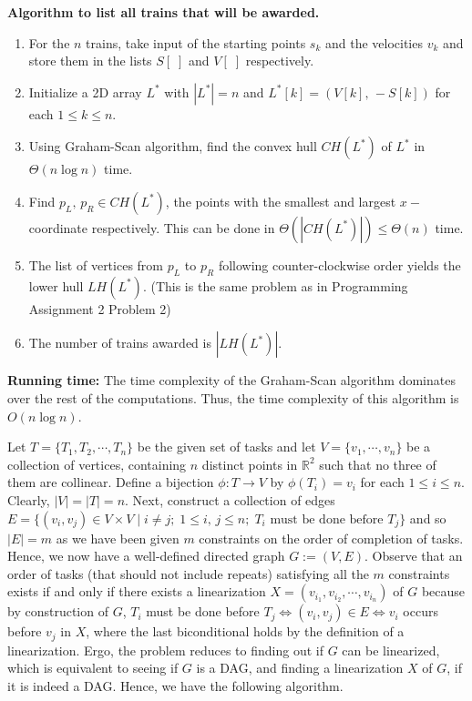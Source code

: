 \documentclass[tikz, letterpaper,12pt]{article}
\newcommand{\RR}{\mathbb{R}}
\newcounter{problemid}\stepcounter{problemid}
\def\newproblem{\vspace*{0.01cm}{\bf Problem~\arabic{problemid}\stepcounter{problemid}}\hfill\fbox{\parbox{0.16\textwidth}{\bf Points:}}\par}
\begin{document}
\textbf{Algorithm to list all trains that will be awarded.}
\begin{enumerate}
  \item For the $n$ trains, take input of the starting points $s_k$ and the velocities $v_k$ and store them in the lists $S[\;]$ and $V[\;]$ respectively.
  \item Initialize a 2D array $L^*$ with $|L^*|=n$ and $L^*[k]=(V[k],\,-S[k])$ for each $1\leq k\leq n$.
  \item Using Graham-Scan algorithm, find the convex hull $CH(L^*)$ of $L^*$ in $\Theta(n\log n)$ time.
  \item Find $p_L,\,p_R\in CH(L^*)$, the points with the smallest and largest $x-$coordinate respectively. This can be done in $\Theta(|CH(L^*)|)\leq\Theta(n)$ time.
  \item The list of vertices from $p_L$ to $p_R$ following counter-clockwise order yields the lower hull $LH(L^*)$. (This is the same problem as in Programming Assignment 2 Problem 2)
  \item The number of trains awarded is $|LH(L^{\ast})|$.
\end{enumerate}

\textbf{Running time:} The time complexity of the Graham-Scan algorithm dominates over the rest of the computations. Thus, the time complexity of this algorithm is $O(n\log n)$.

\newproblem
Let $T=\{T_1,T_2,\cdots,T_n\}$ be the given set of tasks and let $V=\{v_1,\cdots ,v_n\}$ be a collection of vertices, containing $n$ distinct points in $\RR^2$ such that no three of them are collinear. Define a bijection $\phi\colon T\to V$ by $\phi(T_i)=v_i$ for each $1\leq i\leq n$. Clearly, $|V|=|T|=n$. Next, construct a collection of edges $E=\{(v_i,v_j)\in V\times V\mid i\neq j;\; 1\leq i,\,j\leq n;\; T_i\text{ must be done before }T_j\}$ and so $|E|=m$ as we have been given $m$ constraints on the order of completion of tasks. Hence, we now have a well-defined directed graph $G:=(V,E)$. Observe that an order of tasks (that should not include repeats) satisfying all the $m$ constraints exists if and only if there exists a linearization $X=(v_{i_1},v_{i_2},\cdots,v_{i_n})$ of $G$ because by construction of $G$, $T_i$ must be done before $T_j\iff (v_i,v_j)\in E\iff v_i$ occurs before $v_j$ in $X$, where the last biconditional holds by the definition of a linearization. Ergo, the problem reduces to finding out if $G$ can be linearized, which is equivalent to seeing if $G$ is a DAG, and finding a linearization $X$ of $G$, if it is indeed a DAG. Hence, we have the following algorithm.
\end{document}
